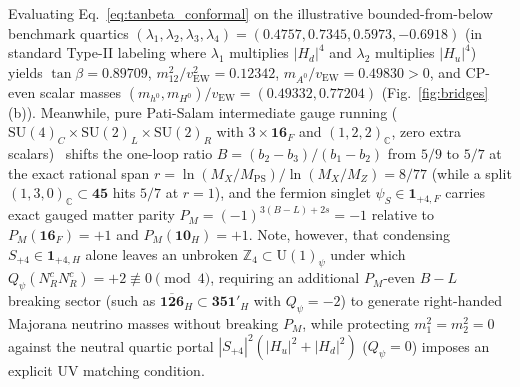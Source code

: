 \documentclass[aps,prd,twocolumn,nofootinbib,floatfix]{revtex4-2}
\begin{document}
Evaluating Eq.~\eqref{eq:tanbeta_conformal} on the illustrative bounded-from-below benchmark quartics $(\lambda_1, \lambda_2, \lambda_3, \lambda_4) = (0.4757, 0.7345, 0.5973, -0.6918)$ (in standard Type-II labeling where $\lambda_1$ multiplies $|H_d|^4$ and $\lambda_2$ multiplies $|H_u|^4$) yields $\tan\beta = 0.89709$, $m_{12}^2/v_{\mathrm{EW}}^2 = 0.12342$, $m_{A^0}/v_{\mathrm{EW}} = 0.49830 > 0$, and CP-even scalar masses $(m_{h^0}, m_{H^0})/v_{\mathrm{EW}} = (0.49332, 0.77204)$ (Fig.~\ref{fig:bridges}(b)).
Meanwhile, pure Pati-Salam intermediate gauge running ($\mathrm{SU}(4)_C\times\mathrm{SU}(2)_L\times\mathrm{SU}(2)_R$ with $3\times\mathbf{16}_F$ and $(1,2,2)_{\mathbb{C}}$, zero extra scalars)~\cite{MohapatraMarshak1980} shifts the one-loop ratio $B = (b_2 - b_3)/(b_1 - b_2)$ from $5/9$ to $5/7$ at the exact rational span $r = \ln(M_X/M_{\mathrm{PS}})/\ln(M_X/M_Z) = 8/77$ (while a split $(1,3,0)_{\mathbb{C}} \subset \mathbf{45}$ hits $5/7$ at $r = 1$), and the fermion singlet $\psi_S \in \mathbf{1}_{+4,F}$ carries exact gauged matter parity $P_M = (-1)^{3(B-L)+2s} = -1$ relative to $P_M(\mathbf{16}_F) = +1$ and $P_M(\mathbf{10}_H) = +1$. Note, however, that condensing $S_{+4} \in \mathbf{1}_{+4,H}$ alone leaves an unbroken $\mathbb{Z}_4 \subset \mathrm{U}(1)_\psi$ under which $Q_\psi(N_R^c N_R^c) = +2 \not\equiv 0 \pmod 4$, requiring an additional $P_M$-even $B - L$ breaking sector (such as $\overline{\mathbf{126}}_H \subset \mathbf{351}'_H$ with $Q_\psi = -2$) to generate right-handed Majorana neutrino masses without breaking $P_M$, while protecting $m_1^2 = m_2^2 = 0$ against the neutral quartic portal $|S_{+4}|^2(|H_u|^2 + |H_d|^2)$ ($Q_\psi = 0$) imposes an explicit UV matching condition.
\end{document}
